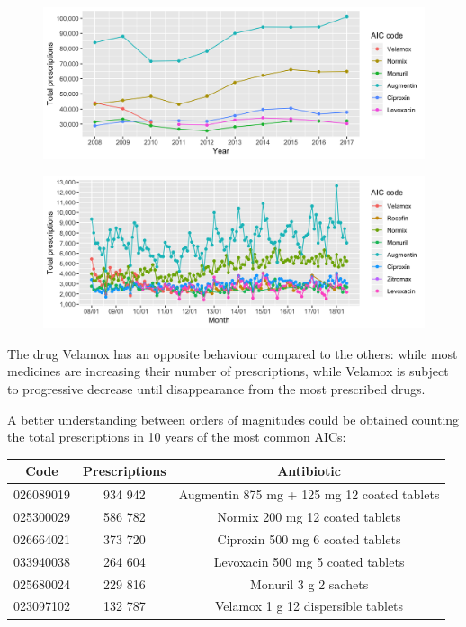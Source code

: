 \begin{figure}[h]
	\centering
	\includegraphics[scale=0.3]{../plots/top_aic-year.png}
\end{figure}

\begin{figure}[h]
	\centering
	\includegraphics[scale=0.3]{../plots/top_aic-month.png}
\end{figure}

The drug Velamox has an opposite behaviour compared to the others: while most medicines are increasing their number of prescriptions, while Velamox is subject to progressive decrease until disappearance from the most prescribed drugs.

A better understanding between orders of magnitudes could be obtained counting the total prescriptions in 10 years of the most common AICs:

\begin{center}
	\begin{tabular}{c|c|c}
		Code & Prescriptions & Antibiotic \\
		\hline
		026089019 & 934 942 & Augmentin 875 mg + 125 mg 12 coated tablets \\
		\hline
		025300029 & 586 782 & Normix 200 mg 12 coated tablets\\
		\hline
		026664021 & 373 720 & Ciproxin 500 mg 6 coated tablets \\
		\hline
		033940038 & 264 604 & Levoxacin 500 mg 5 coated tablets \\
		\hline
		025680024 & 229 816 & Monuril 3 g 2 sachets \\
		\hline
		023097102 & 132 787 & Velamox 1 g 12 dispersible tablets \\
	\end{tabular}
\end{center}

